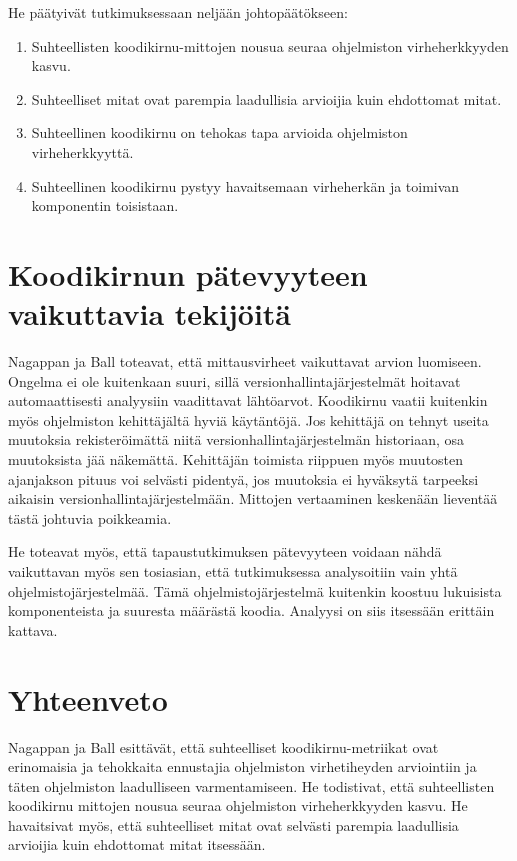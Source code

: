 \documentclass[finnish]{../tktltiki2}
\theoremstyle{definition}
\theoremstyle{remark}
\begin{document}
\noindent He päätyivät tutkimuksessaan neljään johtopäätökseen:

\begin{enumerate}

    \item Suhteellisten koodikirnu-mittojen nousua seuraa ohjelmiston virheherkkyyden kasvu.

    \item Suhteelliset mitat ovat parempia laadullisia arvioijia kuin ehdottomat mitat.

    \item Suhteellinen koodikirnu on tehokas tapa arvioida ohjelmiston virheherkkyyttä.

    \item Suhteellinen koodikirnu pystyy havaitsemaan virheherkän ja toimivan komponentin toisistaan.

\end{enumerate}

\section{Koodikirnun pätevyyteen vaikuttavia tekijöitä}

Nagappan ja Ball toteavat, että mittausvirheet vaikuttavat arvion luomiseen. Ongelma ei ole kuitenkaan suuri, sillä 
versionhallintajärjestelmät hoitavat automaattisesti analyysiin vaadittavat lähtöarvot. Koodikirnu vaatii kuitenkin myös 
ohjelmiston kehittäjältä hyviä käytäntöjä. Jos kehittäjä on tehnyt useita muutoksia rekisteröimättä niitä 
versionhallintajärjestelmän historiaan, osa muutoksista jää näkemättä. Kehittäjän toimista riippuen myös muutosten 
ajanjakson pituus voi selvästi pidentyä, jos muutoksia ei hyväksytä tarpeeksi aikaisin versionhallintajärjestelmään. 
Mittojen vertaaminen keskenään lieventää tästä johtuvia poikkeamia.

    He toteavat myös, että tapaustutkimuksen pätevyyteen voidaan nähdä vaikuttavan myös sen tosiasian, että 
tutkimuksessa analysoitiin vain yhtä ohjelmistojärjestelmää. Tämä ohjelmistojärjestelmä kuitenkin koostuu lukuisista 
komponenteista ja suuresta määrästä koodia. Analyysi on siis itsessään erittäin kattava.

\section{Yhteenveto}

Nagappan ja Ball esittävät, että suhteelliset koodikirnu-metriikat ovat erinomaisia ja tehokkaita ennustajia ohjelmiston 
virhetiheyden arviointiin ja täten ohjelmiston laadulliseen varmentamiseen. He todistivat, että suhteellisten koodikirnu
mittojen nousua seuraa ohjelmiston virheherkkyyden kasvu. He havaitsivat myös, että suhteelliset mitat ovat selvästi 
parempia laadullisia arvioijia kuin ehdottomat mitat itsessään.




\end{document}

